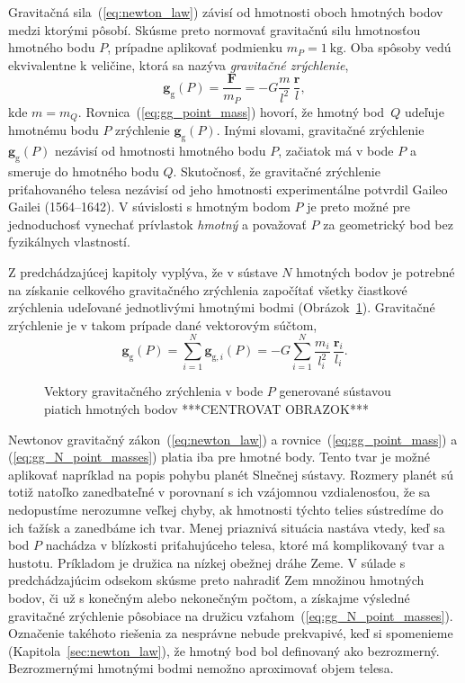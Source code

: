 \documentclass[a4paper, 12pt]{book}
\newcommand{\gidx}{\mathrm g}
\let\vec\mathbf
\begin{document}
Gravitačná sila~(\ref{eq:newton_law}) závisí od hmotnosti oboch hmotných 
bodov medzi ktorými pôsobí.  Skúsme preto normovať gravitačnú silu hmotnosťou 
hmotného bodu $P$, prípadne aplikovať podmienku $m_P = 1\ \mathrm{kg}$.  Oba 
spôsoby vedú ekvivalentne k veličine, ktorá sa nazýva \emph{gravitačné 
zrýchlenie},
%
\begin{equation}
\label{eq:gg_point_mass}
\vec g_\gidx(P) = \frac{\vec F}{m_P} = -G \frac{m}{l^2} \, \frac{\vec r}{l}{,}
\end{equation}
%
kde $m = m_Q$.  Rovnica~(\ref{eq:gg_point_mass}) hovorí, že hmotný 
bod~$Q$ udeľuje hmotnému bodu $P$ zrýchlenie $\vec g_\gidx(P)$.   Inými 
slovami, gravitačné zrýchlenie $\vec g_\gidx(P)$ nezávisí od hmotnosti hmotného 
bodu $P$, začiatok má v bode $P$ a smeruje do hmotného bodu $Q$.  Skutočnosť, 
že gravitačné zrýchlenie priťahovaného telesa nezávisí od jeho hmotnosti 
experimentálne potvrdil Gaileo Gailei (1564--1642).  V súvislosti s hmotným 
bodom $P$ je preto možné pre jednoduchosť vynechať prívlastok \emph{hmotný} 
a považovať $P$ za geometrický bod bez fyzikálnych vlastností.

Z predchádzajúcej kapitoly vyplýva, že v sústave $N$ hmotných bodov je potrebné 
na získanie celkového gravitačného zrýchlenia započítať všetky čiastkové 
zrýchlenia udeľované jednotlivými hmotnými bodmi 
(Obrázok~\ref{fig:gg_n_point_masses}).  Gravitačné zrýchlenie je v takom 
prípade dané vektorovým súčtom,
%
\begin{equation}
\label{eq:gg_N_point_masses}
\vec g_\gidx(P) = \sum_{i = 1}^{N}\vec g_{\gidx,i}(P) = -G \sum_{i = 1}^{N} 
\frac{m_i}{l_i^2} \, \frac{\vec r_i}{l_i}{.}
\end{equation}

\begin{figure}[b]
\centering

\caption{Vektory gravitačného zrýchlenia v bode $P$ generované sústavou piatich 
hmotných bodov ***CENTROVAT OBRAZOK***}
\label{fig:gg_n_point_masses}
\end{figure}

Newtonov gravitačný zákon~(\ref{eq:newton_law}) 
a rovnice~(\ref{eq:gg_point_mass}) 
a (\ref{eq:gg_N_point_masses}) platia iba pre hmotné body.  
Tento tvar je možné aplikovať napríklad na popis pohybu planét Slnečnej 
sústavy.  Rozmery planét sú totiž natoľko zanedbateľné v porovnaní s ich 
vzájomnou vzdialenosťou, že sa nedopustíme nerozumne veľkej chyby, ak hmotnosti 
týchto telies sústredíme do ich ťažísk a zanedbáme ich tvar.  Menej priaznivá 
situácia nastáva vtedy, keď sa bod $P$ nachádza v blízkosti priťahujúceho 
telesa, ktoré má komplikovaný tvar a hustotu.  Príkladom je družica na nízkej 
obežnej dráhe Zeme.  V súlade s predchádzajúcim odsekom skúsme preto nahradiť 
Zem množinou hmotných bodov, či už s konečným alebo nekonečným počtom, 
a získajme výsledné gravitačné zrýchlenie pôsobiace na družicu 
vzťahom~(\ref{eq:gg_N_point_masses}).  Označenie takéhoto 
riešenia za nesprávne nebude prekvapivé, keď si spomenieme 
(Kapitola~\ref{sec:newton_law}), že hmotný bod bol definovaný 
ako bezrozmerný.  Bezrozmernými hmotnými bodmi nemožno aproximovať objem 
telesa.
\end{document}
